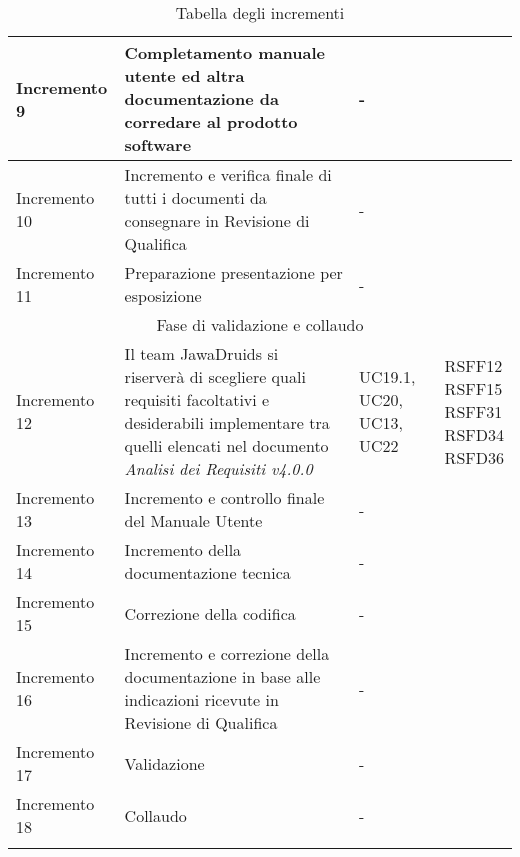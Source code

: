 \begin{center}
\begin{longtable}[c]{p{3cm}|p{5cm}|p{4cm}|p{3cm}}
		\hline
		\centering Incremento 9 & \centering Completamento manuale utente ed altra documentazione da corredare al prodotto software & \centering - & \makecell[tc]{-} \\
		\hline
		\centering Incremento 10 & \centering Incremento e verifica finale di tutti i documenti da consegnare in Revisione di Qualifica & \centering - & \makecell[tc]{-} \\
		\hline
		\centering Incremento 11 & \centering Preparazione presentazione per esposizione & \centering - & \makecell[tc]{-} \\
		\hline
		\multicolumn{4}{|c|}{Fase di validazione e collaudo}\\
		\hline
		\centering Incremento 12 & \centering Il team JawaDruids si riserverà di scegliere quali requisiti facoltativi e desiderabili implementare tra quelli elencati nel documento \textit{Analisi dei Requisiti v4.0.0}  & \centering UC19.1, UC20, UC13, UC22 & \makecell[tc]{RSFF12 \\ RSFF15 \\ RSFF31 \\ RSFD34 \\ RSFD36} \\
		\hline
		\centering Incremento 13 & \centering Incremento e controllo finale del Manuale Utente   & \centering - & \makecell[tc]{-} \\
		\hline
		\centering Incremento 14 & \centering Incremento della documentazione tecnica & \centering - & \makecell[tc]{-} \\
		\hline
		\centering Incremento 15 & \centering Correzione della codifica  & \centering - & \makecell[tc]{-} \\
		\hline
		\centering Incremento 16 & \centering Incremento e correzione della documentazione in base alle indicazioni ricevute in Revisione di Qualifica & \centering - & \makecell[tc]{-} \\
		\hline
		\centering Incremento 17 & \centering Validazione & \centering - & \makecell[tc]{-} \\
		\hline
		\centering Incremento 18 & \centering Collaudo & \centering - & \makecell[tc]{-} \\
		\hline
		\rowcolor{white}
		\caption[\textbf{Tabella degli incrementi}]{Tabella degli incrementi}\label{qua va in base alle label di altre tabelle mi sa}
	\end{longtable}
\end{center}
